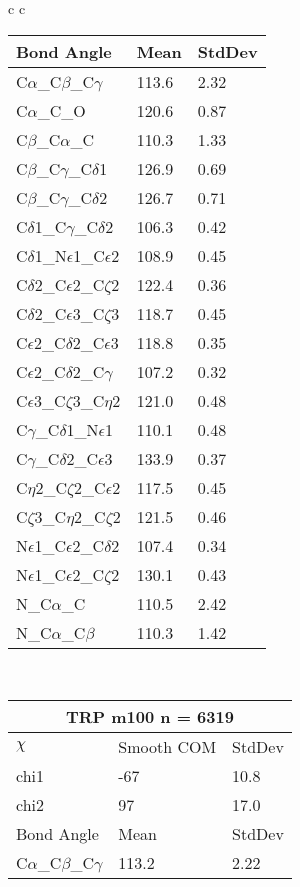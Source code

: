 \begin{longtable}{ c c }
\begin{tabular}{ l l l }
  Bond Angle   & Mean     & StdDev \\ \midrule
  C$\alpha$\_C$\beta$\_C$\gamma$ & 113.6 & 2.32\\
  C$\alpha$\_C\_O & 120.6 & 0.87\\
  C$\beta$\_C$\alpha$\_C & 110.3 & 1.33\\
  C$\beta$\_C$\gamma$\_C$\delta$1 & 126.9 & 0.69\\
  C$\beta$\_C$\gamma$\_C$\delta$2 & 126.7 & 0.71\\
  C$\delta$1\_C$\gamma$\_C$\delta$2 & 106.3 & 0.42\\
  C$\delta$1\_N$\epsilon$1\_C$\epsilon$2 & 108.9 & 0.45\\
  C$\delta$2\_C$\epsilon$2\_C$\zeta$2 & 122.4 & 0.36\\
  C$\delta$2\_C$\epsilon$3\_C$\zeta$3 & 118.7 & 0.45\\
  C$\epsilon$2\_C$\delta$2\_C$\epsilon$3 & 118.8 & 0.35\\
  C$\epsilon$2\_C$\delta$2\_C$\gamma$ & 107.2 & 0.32\\
  C$\epsilon$3\_C$\zeta$3\_C$\eta$2 & 121.0 & 0.48\\
  C$\gamma$\_C$\delta$1\_N$\epsilon$1 & 110.1 & 0.48\\
  C$\gamma$\_C$\delta$2\_C$\epsilon$3 & 133.9 & 0.37\\
  C$\eta$2\_C$\zeta$2\_C$\epsilon$2 & 117.5 & 0.45\\
  C$\zeta$3\_C$\eta$2\_C$\zeta$2 & 121.5 & 0.46\\
  N$\epsilon$1\_C$\epsilon$2\_C$\delta$2 & 107.4 & 0.34\\
  N$\epsilon$1\_C$\epsilon$2\_C$\zeta$2 & 130.1 & 0.43\\
  N\_C$\alpha$\_C & 110.5 & 2.42\\
  N\_C$\alpha$\_C$\beta$ & 110.3 & 1.42\\
  \bottomrule
  \end{tabular}
  \\
  \begin{tabular}{ l l l }
  \toprule
  \multicolumn{3}{c}{TRP \textbf{m100} n = 6319} \\ \toprule
  $\chi$       & Smooth COM & StdDev \\ \midrule
  chi1 & -67 & 10.8 \\ 
  chi2 & 97 & 17.0 \\ \midrule
  Bond Angle   & Mean     & StdDev \\ \midrule
  C$\alpha$\_C$\beta$\_C$\gamma$ & 113.2 & 2.22\\

\end{tabular}
\end{longtable}
